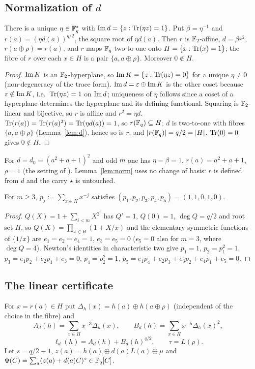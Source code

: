 \subsection{Normalization of $d$}\label{ss:norm}
\begin{lemma}\label{lem:norm}
There is a unique $\eta\in\mathbb{F}_q^\ast$ with $\mathrm{Im}\, d=\{z:\mathrm{Tr}(\eta z)=1\}$. Put $\beta=\eta^{-1}$ and
$r(a)=(\eta d(a))^{q/2}$, the square root of $\eta d(a)$. Then $r$ is $\mathbb{F}_2$-affine, $d=\beta r^2$,
$r(a\oplus\rho)=r(a)$, and $r$ maps $\mathbb{F}_q$ two-to-one onto $H=\{x:\mathrm{Tr}(x)=1\}$; the fibre of $r$ over each
$x\in H$ is a pair $\{a,a\oplus\rho\}$. Moreover $0\notin H$.
\end{lemma}
\begin{proof}
$\mathrm{Im}\, K$ is an $\mathbb{F}_2$-hyperplane, so $\mathrm{Im}\, K=\{z:\mathrm{Tr}(\eta z)=0\}$ for a unique $\eta\ne0$ (non-degeneracy of
the trace form). $\mathrm{Im}\, d=\varepsilon\oplus\mathrm{Im}\, K$ is the other coset because $\varepsilon\notin\mathrm{Im}\, K$, i.e.\
$\mathrm{Tr}(\eta z)=1$ on $\mathrm{Im}\, d$; uniqueness of $\eta$ follows since a coset of a hyperplane determines the
hyperplane and its defining functional. Squaring is $\mathbb{F}_2$-linear and bijective, so $r$ is affine and
$r^2=\eta d$. $\mathrm{Tr}(r(a))=\mathrm{Tr}(r(a)^2)=\mathrm{Tr}(\eta d(a))=1$, so $r(\mathbb{F}_q)\subseteq H$; $d$ is two-to-one with fibres
$\{a,a\oplus\rho\}$ (Lemma~\ref{lem:d}), hence so is $r$, and $|r(\mathbb{F}_q)|=q/2=|H|$. $\mathrm{Tr}(0)=0$ gives $0\notin H$.
\end{proof}
For $d=d_0=(a^2+a+1)^2$ and odd $m$ one has $\eta=\beta=1$, $r(a)=a^2+a+1$, $\rho=1$ (the setting of
\cite{FukuiFFA}). Lemma~\ref{lem:norm} uses no change of basis: $r$ is defined from $d$
and the carry $\star$ is untouched.

\begin{lemma}\label{lem:P}
For $m\ge3$, $p_j:=\sum_{x\in H}x^{-j}$ satisfies $(p_1,p_2,p_3,p_4,p_5)=(1,1,0,1,0)$.
\end{lemma}
\begin{proof}
$Q(X)=1+\sum_{i<m}X^{2^i}$ has $Q'=1$, $Q(0)=1$, $\deg Q=q/2$ and root set $H$, so
$Q(X)=\prod_{x\in H}(1+X/x)$ and the elementary symmetric functions of $\{1/x\}$ are $e_1=e_2=e_4=1$,
$e_3=e_5=0$ ($e_5=0$ also for $m=3$, where $\deg Q=4$). Newton's identities in characteristic two give
$p_1=1$, $p_2=p_1^2=1$, $p_3=e_1p_2+e_2p_1+e_3=0$, $p_4=p_2^2=1$, $p_5=e_1p_4+e_2p_3+e_3p_2+e_4p_1+e_5=0$.
\end{proof}

\subsection{The linear certificate}
For $x=r(a)\in H$ put $\Delta_h(x)=h(a)\oplus h(a\oplus\rho)$ (independent of the choice in the fibre) and
\[
A_d(h)=\sum_{x\in H}x^{-3}\Delta_h(x),\qquad B_d(h)=\sum_{x\in H}x^{-5}\Delta_h(x)^2,
\]
\[
\ell_d(h)=A_d(h)+B_d(h)^{q/2},\qquad \tau=L(\rho).
\]
Let $s=q/2-1$, $z(a)=h(a)\oplus d(a)L(a)\oplus\mu$ and $\Phi(C)=\sum_a(z(a)+d(a)C)^s\in\mathbb{F}_q[C]$.

